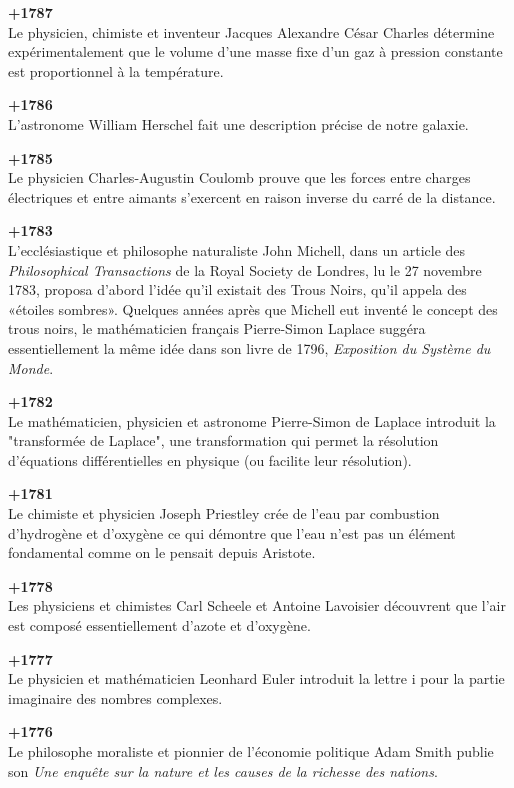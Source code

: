 \textbf{+1787}\\
Le physicien, chimiste et inventeur Jacques Alexandre César Charles détermine expérimentalement que le volume d'une masse fixe d'un gaz à pression constante est proportionnel à la température.

\textbf{+1786}\\
L'astronome William Herschel fait une description précise de notre galaxie.

\textbf{+1785}\\
Le physicien Charles-Augustin Coulomb prouve que les forces entre charges électriques et entre aimants s'exercent en raison inverse du carré de la distance.

\textbf{+1783}\\
L'ecclésiastique et philosophe naturaliste John Michell, dans un article des \textit{Philosophical Transactions} de la Royal Society de Londres, lu le 27 novembre 1783, proposa d'abord l'idée qu'il existait des Trous Noirs, qu'il appela des «étoiles sombres». Quelques années après que Michell eut inventé le concept des trous noirs, le mathématicien français Pierre-Simon Laplace suggéra essentiellement la même idée dans son livre de 1796, \textit{Exposition du Système du Monde}. 

\textbf{+1782}\\
Le mathématicien, physicien et astronome Pierre-Simon de Laplace introduit la "transformée de Laplace", une transformation qui permet la résolution d'équations différentielles en physique (ou facilite leur résolution).

\textbf{+1781}\\
Le chimiste et physicien Joseph Priestley crée de l'eau par combustion d'hydrogène et d'oxygène ce qui démontre que l'eau n'est pas un élément fondamental comme on le pensait depuis Aristote.

\textbf{+1778}\\
Les physiciens et chimistes Carl Scheele et Antoine Lavoisier découvrent que l'air est composé essentiellement d'azote et d'oxygène.

\textbf{+1777}\\
Le physicien et mathématicien Leonhard Euler introduit la lettre $\mathrm{i}$ pour la partie imaginaire des nombres complexes.

\textbf{+1776}\\
Le philosophe moraliste et pionnier de l'économie politique Adam Smith publie son \textit{Une enquête sur la nature et les causes de la richesse des nations}.

